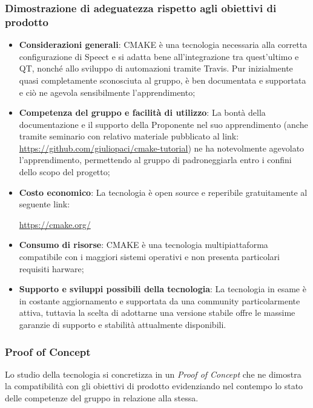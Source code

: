 \documentclass[./../Technology Baseline.tex]{subfiles}
\begin{document}
\subsubsection{Dimostrazione di adeguatezza rispetto agli obiettivi di prodotto}
\begin{itemize}
	\item \textbf{Considerazioni generali}: CMAKE è una tecnologia necessaria alla corretta configurazione di Speect e si adatta bene all'integrazione tra quest'ultimo e QT, nonché allo sviluppo di automazioni tramite Travis. Pur inizialmente quasi completamente sconosciuta al gruppo, è ben documentata e supportata e ciò ne agevola sensibilmente l'apprendimento;
	\item \textbf{Competenza del gruppo e facilità di utilizzo}: La bontà della documentazione e il supporto della Proponente nel suo apprendimento (anche tramite seminario con relativo materiale pubblicato al link: \url{https://github.com/giuliopaci/cmake-tutorial}) ne ha notevolmente agevolato l'apprendimento, permettendo al gruppo di padroneggiarla entro i confini dello scopo del progetto;
	
	\item \textbf{Costo economico}: La tecnologia è open source e reperibile gratuitamente al seguente link:
	\begin{center}
		\url{https://cmake.org/}
	\end{center}

	\item \textbf{Consumo di risorse}: CMAKE è una tecnologia multipiattaforma compatibile con i maggiori sistemi operativi e non presenta particolari requisiti harware;
	
	\item \textbf{Supporto e sviluppi possibili della tecnologia}: La tecnologia in esame è in costante aggiornamento e supportata da una community particolarmente attiva, tuttavia la scelta di adottarne una versione stabile offre le massime garanzie di supporto e stabilità attualmente disponibili.
\end{itemize}

\subsubsection{Proof of Concept}
Lo studio della tecnologia si concretizza in un \textit{Proof of Concept} che ne dimostra la compatibilità con gli obiettivi di prodotto evidenziando nel contempo lo stato delle competenze del gruppo in relazione alla stessa.
\end{document}
